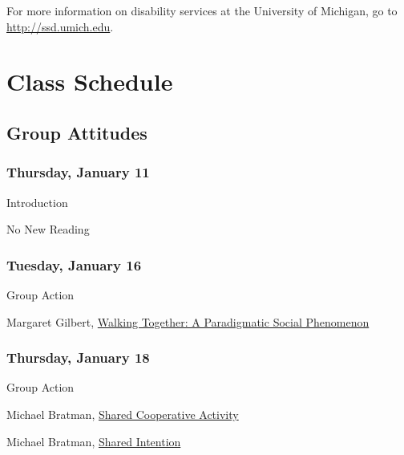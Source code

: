 \documentclass[
  12pt,
  letterpaper,
  DIV=11,
  numbers=noendperiod]{scrartcl}
\providecommand{\tightlist}{%
  \setlength{\itemsep}{0pt}\setlength{\parskip}{0pt}}\usepackage{longtable,booktabs,array}
\begin{document}
For more information on disability services at the University of
Michigan, go to \url{http://ssd.umich.edu}.

\section{Class Schedule}\label{class-schedule}

\subsection{Group Attitudes}\label{group-attitudes}

\subsubsection{Thursday, January 11}\label{thursday-january-11}

\begin{description}
\tightlist
\item[Topic]
Introduction
\item[Reading]
No New Reading
\end{description}

\subsubsection{Tuesday, January 16}\label{tuesday-january-16}

\begin{description}
\tightlist
\item[Topic]
Group Action
\item[Reading]
Margaret Gilbert, \href{https://philpapers.org/rec/GILWTA}{Walking
Together: A Paradigmatic Social Phenomenon}
\end{description}

\subsubsection{Thursday, January 18}\label{thursday-january-18}

\begin{description}
\tightlist
\item[Topic]
Group Action
\item[Reading]
Michael Bratman, \href{https://philpapers.org/rec/BRASCA}{Shared
Cooperative Activity}
\item[Recommended Reading]
Michael Bratman, \href{https://philpapers.org/rec/BRASI}{Shared
Intention}
\end{description}
\end{document}
